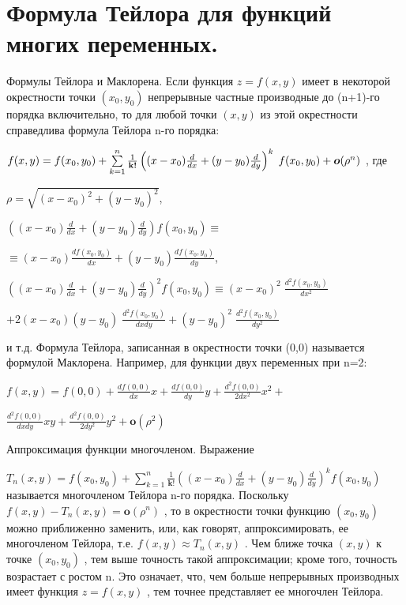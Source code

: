 
\section{Формула Тейлора для функций многих переменных.}

Формулы Тейлора и Маклорена. Если функция  $z=f(x,y)$ имеет в некоторой окрестности точки
$(x_0,y_0)$ непрерывные частные производные до (n+1)-го порядка включительно, то для любой точки $(x,y)$ из этой окрестности справедлива формула Тейлора n-го порядка:

$f(x,y)= f(x_\textup{0},y_\textup{0}) + \sum\limits_{k=1}^n \frac1{\textbf{k!}} \left((x-x_0)\frac{d}{dx}+(y-y_0)\frac{d}{dy}\right)^k \; f(x_0,y_0) + \boldsymbol{o}(\rho^n)$ , где

$
\rho = \sqrt{(x-x_0)^2+(y-y_0)^2}
$,

$
\left((x-x_0)\frac{d}{dx}+(y-y_0)\frac{d}{dy}\right)f(x_0,y_0) \equiv
$

$
\equiv (x-x_0)\frac{df(x_0,y_0)}{dx}+(y-y_0)\frac{df(x_0,y_0)}{dy}
$,

$
\left((x-x_0)\frac{d}{dx}+(y-y_0)\frac{d}{dy}\right)^2 f(x_0,y_0)\equiv (x-x_0)^2 \;\frac{d^2 f(x_0,y_0)}{dx^2} 
$

$
+2(x-x_0)(y-y_0)\;\frac{d^2 f(x_0,y_0)}{dxdy}+(y-y_0)^2 \;\frac{d^2f(x_0,y_0)}{dy^2}
$

и т.д. Формула Тейлора, записанная в окрестности точки (0,0) называется формулой Маклорена. Например, для функции двух переменных при n=2:

$
f(x,y)=f(0,0)+\frac{df(0,0)}{dx}x+\frac{df(0,0)}{dy}y+\frac{d^2 f(0,0)}{2dx^2}x^2+
$

$
\frac{d^2 f(0,0)}{dxdy}xy+\frac{d^2 f(0,0)}{2dy^2}y^2+\boldsymbol{o}(\rho^2)
$

Аппроксимация функции многочленом. Выражение

$
T_n(x,y)=f(x_0,y_0)+\sum\limits_{k=1}^n \frac1{\textbf{k!}} \left((x-x_0)\frac{d}{dx}+(y-y_0)\frac{d}{dy}\right)^k f(x_0,y_0)
$
называется многочленом Тейлора n-го порядка. Поскольку $
f(x,y)-T_n(x,y)=\boldsymbol{o}(\rho^n)
$
, то в окрестности точки функцию $
(x_0,y_0)
$
можно приближенно заменить, или, как говорят, аппроксимировать, ее многочленом Тейлора, т.е.
$
f(x,y)\approx T_n(x,y)
$
. Чем ближе точка
$
(x,y)
$
к точке
$
(x_0,y_0)
$
, тем выше точность такой аппроксимации; кроме того, точность возрастает с ростом n. Это означает, что, чем больше непрерывных производных имеет функция 
$
z=f(x,y)
$
 , тем точнее представляет ее многочлен Тейлора.